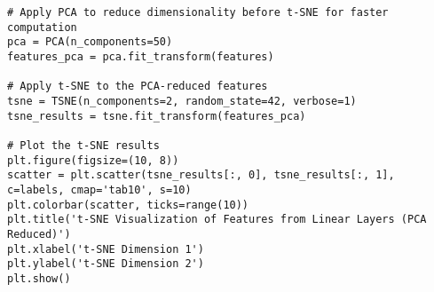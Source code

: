 \documentclass{article}
\begin{document}
\begin{enumerate}
\begin{verbatim}
# Apply PCA to reduce dimensionality before t-SNE for faster computation
pca = PCA(n_components=50)
features_pca = pca.fit_transform(features)

# Apply t-SNE to the PCA-reduced features
tsne = TSNE(n_components=2, random_state=42, verbose=1)
tsne_results = tsne.fit_transform(features_pca)

# Plot the t-SNE results
plt.figure(figsize=(10, 8))
scatter = plt.scatter(tsne_results[:, 0], tsne_results[:, 1], c=labels, cmap='tab10', s=10)
plt.colorbar(scatter, ticks=range(10))
plt.title('t-SNE Visualization of Features from Linear Layers (PCA Reduced)')
plt.xlabel('t-SNE Dimension 1')
plt.ylabel('t-SNE Dimension 2')
plt.show()

    \end{verbatim}\newpage
\end{enumerate}
\end{document}
